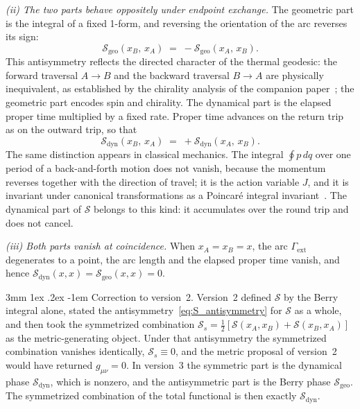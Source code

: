 \documentclass[%
 reprint, amsmath,amssymb, aps, prb, ]{revtex4-2}
\makeatletter
\numberwithin{equation}{section}
\renewcommand\paragraph{%
  \@startsection{paragraph}{4}{\z@}%
    {3mm \@plus 1ex \@minus .2ex}%
    {-1em}%
    {\normalfont\normalsize\itshape}}
\makeatother
\begin{document}
\textit{(ii) The two parts behave oppositely under endpoint exchange.} The geometric part is the integral of a fixed 1-form, and reversing the orientation of the arc reverses its sign:
\begin{equation}
\mathcal{S}_{\mathrm{geo}}(x_B,\, x_A) \;=\; -\mathcal{S}_{\mathrm{geo}}(x_A,\, x_B).
\label{eq:S_antisymmetry}
\end{equation}
This antisymmetry reflects the directed character of the thermal geodesic: the forward traversal $A\to B$ and the backward traversal $B\to A$ are physically inequivalent, as established by the chirality analysis of the companion paper~\cite{hanamura50}; the geometric part encodes spin and chirality. The dynamical part is the elapsed proper time multiplied by a fixed rate. Proper time advances on the return trip as on the outward trip, so that
\begin{equation}
\mathcal{S}_{\mathrm{dyn}}(x_B,\, x_A) \;=\; +\mathcal{S}_{\mathrm{dyn}}(x_A,\, x_B).
\label{eq:S_dyn_symmetry}
\end{equation}
The same distinction appears in classical mechanics. The integral $\oint p\,dq$ over one period of a back-and-forth motion does not vanish, because the momentum reverses together with the direction of travel; it is the action variable $J$, and it is invariant under canonical transformations as a Poincar\'e integral invariant~\cite{Yukawa1954}. The dynamical part of $\mathcal{S}$ belongs to this kind: it accumulates over the round trip and does not cancel.

\textit{(iii) Both parts vanish at coincidence.} When $x_A = x_B = x$, the arc $\Gamma_{\mathrm{ext}}$ degenerates to a point, the arc length and the elapsed proper time vanish, and hence $\mathcal{S}_{\mathrm{dyn}}(x,x) = \mathcal{S}_{\mathrm{geo}}(x,x) = 0$.

\paragraph{Correction to version~2.} Version~2 defined $\mathcal{S}$ by the Berry integral alone, stated the antisymmetry~\eqref{eq:S_antisymmetry} for $\mathcal{S}$ as a whole, and then took the symmetrized combination $\mathcal{S}_s = \tfrac12[\mathcal{S}(x_A,x_B) + \mathcal{S}(x_B,x_A)]$ as the metric-generating object. Under that antisymmetry the symmetrized combination vanishes identically, $\mathcal{S}_s \equiv 0$, and the metric proposal of version~2 would have returned $g_{\mu\nu} = 0$. In version~3 the symmetric part is the dynamical phase $\mathcal{S}_{\mathrm{dyn}}$, which is nonzero, and the antisymmetric part is the Berry phase $\mathcal{S}_{\mathrm{geo}}$. The symmetrized combination of the total functional is then exactly $\mathcal{S}_{\mathrm{dyn}}$.
\end{document}
